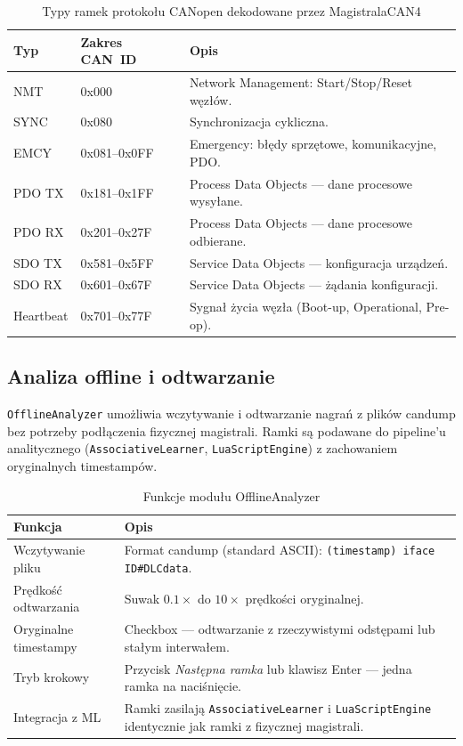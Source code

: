 \documentclass[12pt, a4paper]{article}
\begin{document}
\begin{table}[H]
\caption{Typy ramek protokołu CANopen dekodowane przez MagistralaCAN4}
\label{tab:canopen}
\centering
\small
\begin{tabular}{p{2.5cm}p{3.5cm}p{8.5cm}}
\toprule
\textbf{Typ} & \textbf{Zakres CAN~ID} & \textbf{Opis} \\
\midrule
NMT      & 0x000        & Network Management: Start/Stop/Reset węzłów. \\
SYNC     & 0x080        & Synchronizacja cykliczna. \\
EMCY     & 0x081--0x0FF & Emergency: błędy sprzętowe, komunikacyjne, PDO. \\
PDO TX   & 0x181--0x1FF & Process Data Objects --- dane procesowe wysyłane. \\
PDO RX   & 0x201--0x27F & Process Data Objects --- dane procesowe odbierane. \\
SDO TX   & 0x581--0x5FF & Service Data Objects --- konfiguracja urządzeń. \\
SDO RX   & 0x601--0x67F & Service Data Objects --- żądania konfiguracji. \\
Heartbeat & 0x701--0x77F & Sygnał życia węzła (Boot-up, Operational, Pre-op). \\
\bottomrule
\end{tabular}
\end{table}

\subsection{Analiza offline i odtwarzanie}

\texttt{OfflineAnalyzer} umożliwia wczytywanie i odtwarzanie nagrań
z plików candump bez potrzeby podłączenia fizycznej magistrali.
Ramki są podawane do pipeline'u analitycznego (\texttt{AssociativeLearner},
\texttt{LuaScriptEngine}) z zachowaniem oryginalnych timestampów.

\begin{table}[H]
\caption{Funkcje modułu OfflineAnalyzer}
\label{tab:offline}
\centering
\small
\begin{tabular}{p{4.0cm}p{10.5cm}}
\toprule
\textbf{Funkcja} & \textbf{Opis} \\
\midrule
Wczytywanie pliku &
  Format candump (standard ASCII): \texttt{(timestamp) iface ID\#DLCdata}. \\
Prędkość odtwarzania &
  Suwak $0.1\times$ do $10\times$ prędkości oryginalnej. \\
Oryginalne timestampy &
  Checkbox --- odtwarzanie z rzeczywistymi odstępami lub stałym interwałem. \\
Tryb krokowy &
  Przycisk \emph{Następna ramka} lub klawisz Enter --- jedna ramka na naciśnięcie. \\
Integracja z ML &
  Ramki zasilają \texttt{AssociativeLearner} i \texttt{LuaScriptEngine} identycznie
  jak ramki z fizycznej magistrali. \\
\bottomrule
\end{tabular}
\end{table}
\end{document}
